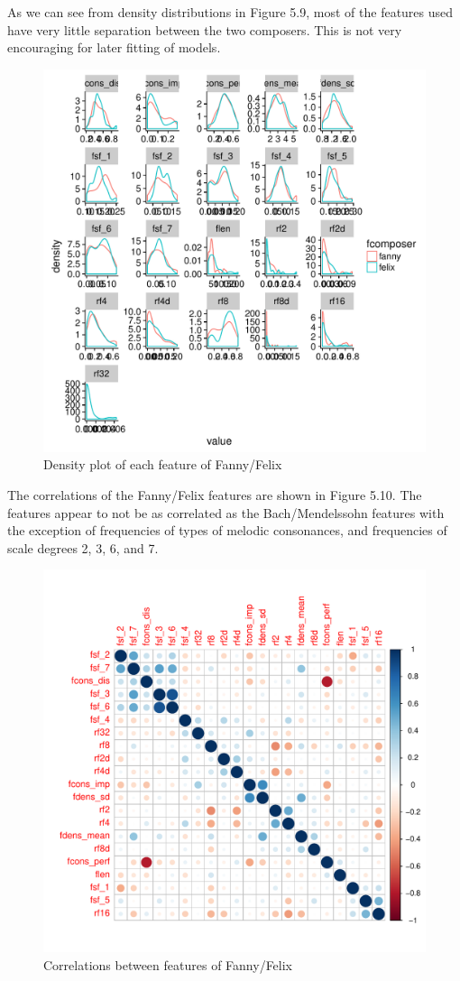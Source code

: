 \documentclass[12pt,twoside]{reedthesis}
\theoremstyle{definition}
\theoremstyle{definition}
\theoremstyle{definition}
\theoremstyle{remark}
\begin{document}
As we can see from density distributions in Figure 5.9, most of the
features used have very little separation between the two composers.
This is not very encouraging for later fitting of models.
\begin{figure}[H]
\centering
\includegraphics[scale = .5]{images/distribution_f.pdf}
\caption{Density plot of each feature of Fanny/Felix}
\label{subd}
\end{figure}
The correlations of the Fanny/Felix features are shown in Figure 5.10.
The features appear to not be as correlated as the Bach/Mendelssohn
features with the exception of frequencies of types of melodic
consonances, and frequencies of scale degrees 2, 3, 6, and 7.
\begin{figure}[H]
\centering
\includegraphics[scale = .5]{images/cor_circles_f.pdf}
\caption{Correlations between features of Fanny/Felix}
\label{subd}
\end{figure}
\end{document}
